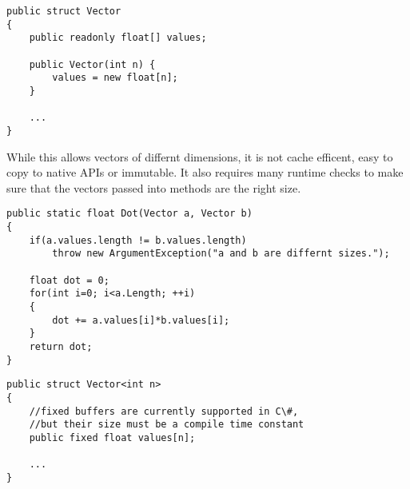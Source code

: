 \begin{lstlisting}[caption={Vector using CLI array}, keywordstyle={\color{blue}},language=sharpc]
public struct Vector
{
	public readonly float[] values;
	
	public Vector(int n) {
		values = new float[n];
	}
	
	...
}
\end{lstlisting}

While this allows vectors of differnt dimensions, it is not cache efficent, easy to copy to native APIs or immutable.
It also requires many runtime checks to make sure that the vectors passed into methods are the right size.

\begin{lstlisting}[caption={Runtime checks needed when using arrays}, keywordstyle={\color{blue}},language=sharpc]
public static float Dot(Vector a, Vector b)
{
	if(a.values.length != b.values.length)
		throw new ArgumentException("a and b are differnt sizes.");
		
	float dot = 0;
	for(int i=0; i<a.Length; ++i)
	{
		dot += a.values[i]*b.values[i];
	}
	return dot;
}
\end{lstlisting}


\begin{lstlisting}[caption={A fixed size vector type}, keywordstyle={\color{blue}},language=sharpc]
public struct Vector<int n>
{
	//fixed buffers are currently supported in C\#,
	//but their size must be a compile time constant
	public fixed float values[n]; 
	
	...
}
\end{lstlisting}